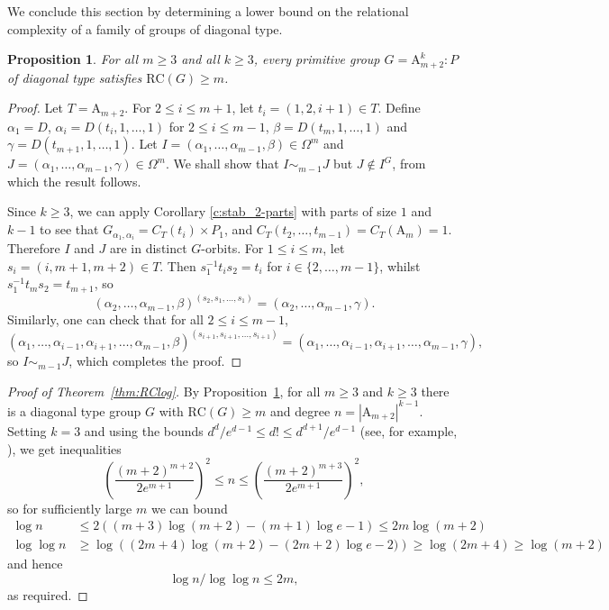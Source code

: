 \documentclass[twoside,a4paper,reqno,11pt]{amsart}
\newcommand{\RC}{\mathrm{RC}}
\renewcommand{\a}{\alpha}
\newcommand{\<}{\langle}
\renewcommand{\>}{\rangle}
\newcommand{\leqs}{\leqslant}
\newcommand{\geqs}{\geqslant}
\def\ge{\geqs}
\newcommand{\An}{\mathrm{A}}
\newtheorem{prop}[thm]{Proposition}
\theoremstyle{definition}
\begin{document}
We conclude this section by determining a lower bound on the relational complexity of a family of groups of diagonal type.

\begin{prop}
	\label{p:RC_to_inf}
	For all $m \ge 3$ and all $k \geqs 3$, every primitive group $G = \An_{m+2}^k{:}P$ of diagonal type satisfies $\mathrm{RC}(G) \geqs m$.
\end{prop}

\begin{proof}
	Let $T =  \An_{m+2}$. %
    For $2\leqslant i\leqslant m+1$, let $t_i = (1,2,i+1)\in T$. Define $\alpha_1 = D$, $\alpha_i = D(t_i,1,\dots,1)$ for $2\leqslant i\leqslant m-1$, $\beta = D(t_{m},1,\dots,1)$ and $\gamma = D(t_{m+1},1,\dots,1)$. Let $I = (\alpha_1, \ldots, \alpha_{m-1}, \beta) \in \Omega^m$ and $J = (\alpha_1, \ldots, \alpha_{m-1}, \gamma) \in \Omega^m$. We shall show that $I \sim_{m-1} J$ but $J \not\in I^G$, from which the result follows. 
	
	Since $k \geqs 3$, we can apply Corollary \ref{c:stab_2-parts} with parts of size $1$ and $k-1$ to see that $G_{\alpha_1, \alpha_i} = C_T(t_i)\times P_1$, and $C_T(t_2,\dots,t_{m-1}) = C_{T}(\An_{m}) = 1$.  Therefore $I$ and $J$ are in distinct $G$-orbits. For $1\leqs i\leqs m$, let $s_i = (i,m+1,m+2) \in T$. Then $s_1^{-1} t_i s_2 = t_i$ for $i \in \{2, \ldots, m-1\}$, whilst $s_1^{-1} t_m s_2 = t_{m+1}$, so
	\begin{equation*}
	(\alpha_2,\dots,\alpha_{m-1},\beta)^{(s_2,s_1,\dots,s_1)} = (\alpha_2,\dots,\alpha_{m-1},\gamma).
	\end{equation*}
	Similarly, one can check that for all $2\leqs i\leqs m-1$,
	\begin{equation*}
	(\alpha_1,\dots,\a_{i-1},\a_{i+1},\dots,\alpha_{m-1},\beta)^{(s_{i+1},s_{i+1},\dots,s_{i+1})} = (\alpha_1,\dots,\a_{i-1},\a_{i+1},\dots,\alpha_{m-1},\gamma),
	\end{equation*}
	so $I \sim_{m-1} J$, which completes the proof. 
\end{proof}

\begin{proof}[Proof of Theorem~\ref{thm:RClog}]
    By Proposition~\ref{p:RC_to_inf}, for all $m \geqs 3$ and $k \geqs 3$ there is a diagonal type group $G$ with $\RC(G) \geqs m$ and degree $n = |\An_{m+2}|^{k-1}$. Setting $k = 3$ and using the bounds $d^d/e^{d-1} \leqs d! \leqs d^{d+1}/e^{d-1}$ (see, for example, \cite[p. 52]{Knuth}), we get inequalities
    \begin{equation*}
        \left(\frac{(m+2)^{m+2}}{2e^{m+1}}\right)^2 \leqs n  \leqs \left(\frac{(m+2)^{m+3}}{2e^{m+1}}\right)^2,
    \end{equation*}
    so for sufficiently large $m$ we can bound
    \begin{align*}
      \log n & \leqs 2((m+3) \log (m+2) - (m+1) \log e - 1) \leqs 2m \log (m+2) \\
      \log \log n  & \geqs \log \left((2m + 4)\log (m+2) - (2m+2) \log e - 2) \right) \geqs \log (2m+4) \geqs \log (m+2)
    \end{align*} 
    and hence \[ \log n/ \log \log n \leqs 2m,\]
    as required.
\end{proof}
\end{document}
